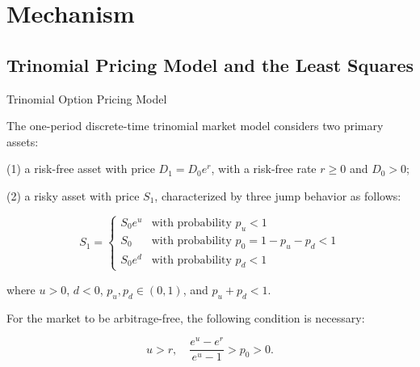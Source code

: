 \documentclass[aspectratio=169,xcolor=dvipsnames]{beamer}
\begin{document}
	
	\section{Mechanism}
	\subsection{Trinomial Pricing Model and the Least Squares}
	
	\begin{frame}{ Trinomial Option Pricing Model}
	
	The one-period discrete-time trinomial market model considers two primary assets: 
	
	(1) a risk-free asset with price 
	\( D_1 = D_0 e^r \), with a risk-free rate \( r \geq 0 \) and \( D_0 > 0 \);
	
	(2) a risky asset with price \( S_1 \), characterized by three jump behavior as follows:
	
	\[
	S_1 = 
	\begin{cases}
		S_0 e^u & \text{with probability } p_u < 1 \\
		S_0     & \text{with probability } p_0 = 1 - p_u - p_d < 1 \\
		S_0 e^d & \text{with probability } p_d < 1
	\end{cases}
	\]
	
	where \( u > 0 \), \( d < 0 \), \( p_u, p_d \in (0, 1) \), and \( p_u + p_d < 1 \).
	
	For the market to be arbitrage-free, the following condition is necessary:
	
	$$
	u > r, \quad \frac{e^u - e^r}{e^u - 1} > p_0 > 0.
	$$
	\end{frame}
\end{document}
